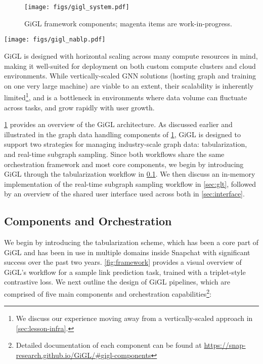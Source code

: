 \begin{figure}[tbp]
    \centering
    \texttt{[image: figs/gigl\_system.pdf]}
    \vspace{-0.1in}
    \caption{GiGL framework components; {\color{purple}magenta} items are work-in-progress.}
    \label{fig:gigl}
    \vspace{-0.1in}
\end{figure}

\begin{figure*}[t]
    \centering
    \texttt{[image: figs/gigl\_nablp.pdf]}
    \vspace{-0.1in}
    \caption{A example GiGL workflow with tabularized subgraph sampling for the task of link prediction, in which the model is trained with triplet-style contrastive loss on a set of anchor nodes along with their positives and (in-batch) negatives. The intermediate results of each component are stored on a cloud storage service such as GCS.}
    \label{fig:framework}
    \vspace{-0.05in}
\end{figure*}

GiGL is designed with horizontal scaling across many compute resources in mind, making it well-suited for deployment on both custom compute clusters and cloud environments. While vertically-scaled GNN solutions (hosting graph and training on one very large machine) are viable to an extent, their scalability is inherently limited\footnote{We discuss our experience moving away from a vertically-scaled approach in \cref{sec:lesson-infra}.}, and is a bottleneck in environments where data volume can fluctuate across tasks, and grow rapidly with user growth. 

\cref{fig:gigl} provides an overview of the GiGL architecture. As discussed earlier and illustrated in the graph data handling components of \cref{fig:gigl}, GiGL is designed to support two strategies for managing industry-scale graph data: tabularization, and real-time subgraph sampling. Since both workflows share the same orchestration framework and most core components, we begin by introducing GiGL through the tabularization workflow in \cref{sec:components}. We then discuss an in-memory implementation of the real-time subgraph sampling workflow in \cref{sec:glt}, followed by an overview of the shared user interface used across both in \cref{sec:interface}.

\subsection{Components and Orchestration}
\label{sec:components}
We begin by introducing the tabularization scheme, which has been a core part of GiGL and has been in use in multiple domains inside Snapchat with significant success over the past two years. \cref{fig:framework} provides a visual overview of GiGL’s workflow for a sample link prediction task, trained with a triplet-style contrastive loss.
We next outline the design of GiGL pipelines, which are comprised of five main components and orchestration capabilities\footnote{Detailed documentation of each component can be found at \url{https://snap-research.github.io/GiGL/\#gigl-components}}:

